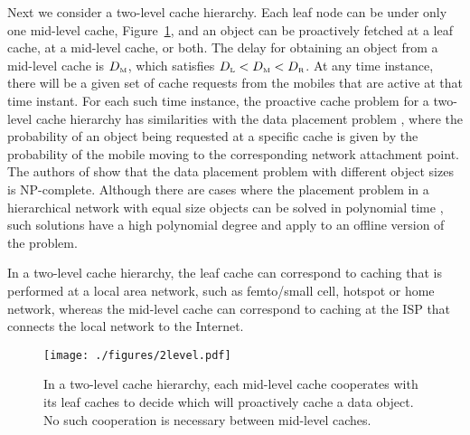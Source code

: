 \documentclass[conference]{IEEEtran}
\newcommand{\mynotex}[1]{}
\newcommand{\M}{\mbox{\tiny M}}
\newcommand{\Leaf}{\mbox{\tiny L}}
\newcommand{\R}{\mbox{\tiny R}}
\begin{document}
Next we consider a two-level cache hierarchy. Each leaf node can be under only one mid-level cache, Figure~\ref{fig:2level}, and  an object can be proactively fetched at a leaf cache, at a mid-level cache, or both.
The delay for obtaining an object from a mid-level cache is $D_{\M}$, which satisfies $D_{\Leaf}<D_{\M} < D_{\R}$.
At any time instance, there will be a given set of cache requests from the  mobiles that are active at that time instant. For each such time instance, the proactive cache problem for a two-level cache hierarchy has similarities with the data placement problem \cite{Bae+08}, where the probability of an object being requested at a specific cache is given by the probability of the mobile moving to the corresponding network attachment point. The authors of  \cite{Bae+08} show that the data placement problem with different object sizes is NP-complete. Although there are cases where the placement problem in a hierarchical network with equal size objects can be solved in polynomial time \cite{Kor+01}, such solutions have a high polynomial degree  and apply to an offline version of the problem.



In  a two-level cache hierarchy, the leaf cache can correspond to caching that is performed at a local area network, such as femto/small cell, hotspot or home network, whereas the mid-level cache can correspond to caching at the ISP that connects the local network to the Internet.

\begin{figure}[b]
\vspace{-0.15in}
\centering
\texttt{[image: ./figures/2level.pdf]}
\caption{In a two-level cache hierarchy, each mid-level cache cooperates with its leaf caches to decide which  will proactively cache a data object. No such cooperation is necessary between mid-level caches.}
\label{fig:2level}
\end{figure}

\mynotex{ADD MORE DETAILS in figure caption}
\end{document}
